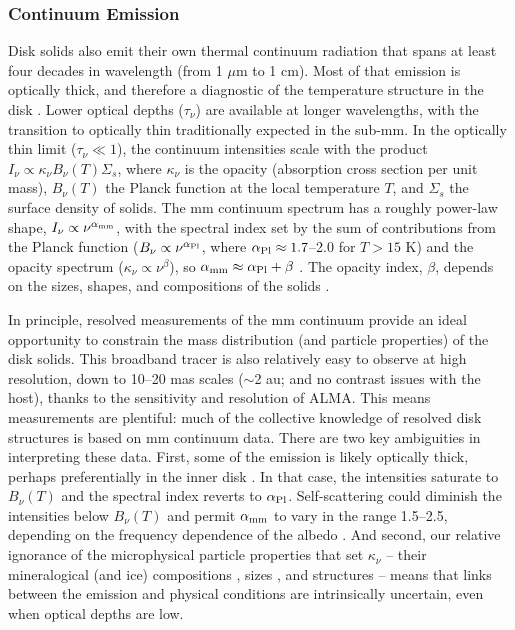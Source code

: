 \documentclass[a4paper]{ar-1col}
\begin{document}
\subsubsection{Continuum Emission}
Disk solids also emit their own thermal continuum radiation that spans at least four decades in wavelength (from 1 $\mu$m to 1 cm).  Most of that emission is optically thick, and therefore a diagnostic of the temperature structure in the disk \citep[e.g., see][]{andrews15}.  Lower optical depths ($\tau_\nu$) are available at longer wavelengths, with the transition to optically thin traditionally expected in the sub-mm.  In the optically thin limit ($\tau_\nu \ll 1$), the continuum intensities scale with the product $I_\nu \propto \kappa_\nu B_\nu(T) \Sigma_s$, where $\kappa_\nu$ is the opacity (absorption cross section per unit mass), $B_\nu(T)$ the Planck function at the local temperature $T$, and $\Sigma_s$ the surface density of solids.  The mm continuum spectrum has a roughly power-law shape, $I_\nu \propto \nu^{\alpha_{\rm mm}}$, with the spectral index set by the sum of contributions from the Planck function ($B_\nu \propto \nu^{\alpha_{\rm Pl}}$, where $\alpha_{\rm Pl} \approx 1.7$--2.0 for $T > 15$ K) and the opacity spectrum ($\kappa_\nu \propto \nu^\beta$), so $\alpha_{\rm mm} \approx \alpha_{\rm Pl} + \beta$ \citep{beckwith91,ricci10a,ricci10b}.  The opacity index, $\beta$, depends on the sizes, shapes, and compositions of the solids \citep{miyake93,dalessio01,draine06}.  

In principle, resolved measurements of the mm continuum provide an ideal opportunity to constrain the mass distribution (and particle properties) of the disk solids.  This broadband tracer is also relatively easy to observe at high resolution, down to 10--20 mas scales ($\sim$2 au; and no contrast issues with the host), thanks to the sensitivity and resolution of ALMA.  This means measurements are plentiful: much of the collective knowledge of resolved disk structures is based on mm continuum data.  There are two key ambiguities in interpreting these data.  First, some of the emission is likely optically thick, perhaps preferentially in the inner disk \citep[see][]{beckwith90,aw05}.  In that case, the intensities saturate to $B_\nu(T)$ and the spectral index reverts to $\alpha_{\rm Pl}$.  Self-scattering could diminish the intensities below $B_\nu(T)$ and permit $\alpha_{\rm mm}$ to vary in the range 1.5--2.5, depending on the frequency dependence of the albedo \citep{zhu19,liu19}.  And second, our relative ignorance of the microphysical particle properties that set $\kappa_\nu$ -- their mineralogical (and ice) compositions \citep{pollack94}, sizes \citep{miyake93}, and structures \citep{henning96} -- means that links between the emission and physical conditions are intrinsically uncertain, even when optical depths are low.
\end{document}
